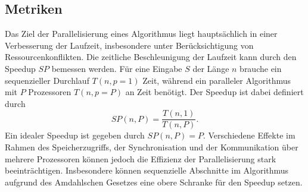 \subsection{Metriken}
Das Ziel der Parallelisierung eines Algorithmus liegt hauptsächlich in einer Verbesserung der Laufzeit, insbesondere unter Berücksichtigung von Ressourcenkonflikten. Die zeitliche
Beschleunigung der Laufzeit kann durch den Speedup $SP$ bemessen werden. Für eine Eingabe $S$ der Länge $n$ brauche ein sequenzieller Durchlauf $T(n, p=1)$ Zeit, während ein paralleler
Algorithmus mit $P$ Prozessoren $T(n,p=P)$ an Zeit benötigt. Der Speedup ist dabei definiert durch
\begin{equation}
    SP(n,P) = \frac{T(n,1)}{T(n,P)}.
\end{equation}
Ein idealer Speedup ist gegeben durch $SP(n,P)=P$. Verschiedene Effekte im Rahmen des Speicherzugriffs, der Synchronisation und der Kommunikation über mehrere Prozessoren können jedoch
die Effizienz der Parallelisierung stark beeinträchtigen. Insbesondere können sequenzielle Abschnitte im Algorithmus aufgrund des Amdahlschen Gesetzes eine obere Schranke für den
Speedup setzen.

